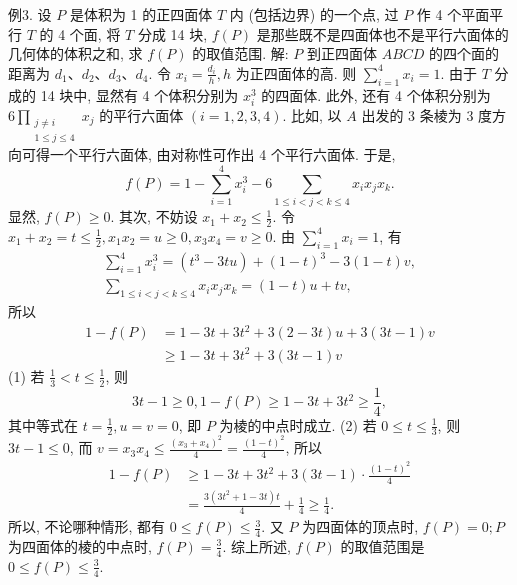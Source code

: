 例3. 设 $P$ 是体积为 1 的正四面体 $T$ 内 (包括边界) 的一个点, 过 $P$ 作 4 个平面平行 $T$ 的 4 个面, 将 $T$ 分成 14 块, $f(P)$ 是那些既不是四面体也不是平行六面体的几何体的体积之和, 求 $f(P)$ 的取值范围.
解: $P$ 到正四面体 $A B C D$ 的四个面的距离为 $d_1 、 d_2 、 d_3 、 d_4$.
令 $x_i=\frac{d_i}{h}, h$ 为正四面体的高.
则 $\sum_{i=1}^4 x_i=1$.
由于 $T$ 分成的 14 块中, 显然有 4 个体积分别为 $x_i^3$ 的四面体.
此外, 还有 4 个体积分别为 $6 \prod_{\substack{j \neq i \\ 1 \leqslant j \leqslant 4}} x_j$ 的平行六面体 $(i=1,2,3,4)$. 比如, 以 $A$ 出发的 3 条棱为 3 度方向可得一个平行六面体, 由对称性可作出 4 个平行六面体.
于是,
$$
f(P)=1-\sum_{i=1}^4 x_i^3-6 \sum_{1 \leqslant i<j<k \leqslant 4} x_i x_j x_k .
$$
显然, $f(P) \geqslant 0$.
其次, 不妨设 $x_1+x_2 \leqslant \frac{1}{2}$. 令 $x_1+x_2=t \leqslant \frac{1}{2}, x_1 x_2=u \geqslant 0, x_3 x_4= v \geqslant 0$. 由 $\sum_{i=1}^4 x_i=1$, 有
$$
\begin{gathered}
\sum_{i=1}^4 x_i^3=\left(t^3-3 t u\right)+(1-t)^3-3(1-t) v, \\
\sum_{1 \leqslant i<j<k \leqslant 4} x_i x_j x_k=(1-t) u+t v,
\end{gathered}
$$
所以
$$
\begin{aligned}
1-f(P) & =1-3 t+3 t^2+3(2-3 t) u+3(3 t-1) v \\
& \geqslant 1-3 t+3 t^2+3(3 t-1) v
\end{aligned}
$$
(1) 若 $\frac{1}{3}<t \leqslant \frac{1}{2}$, 则
$$
3 t-1 \geqslant 0,1-f(P) \geqslant 1-3 t+3 t^2 \geqslant \frac{1}{4},
$$
其中等式在 $t=\frac{1}{2}, u=v=0$, 即 $P$ 为棱的中点时成立.
(2) 若 $0 \leqslant t \leqslant \frac{1}{3}$, 则 $3 t-1 \leqslant 0$, 而 $v=x_3 x_4 \leqslant \frac{\left(x_3+x_4\right)^2}{4}=\frac{(1-t)^2}{4}$, 所以
$$
\begin{aligned}
1-f(P) & \geqslant 1-3 t+3 t^2+3(3 t-1) \cdot \frac{(1-t)^2}{4} \\
& =\frac{3\left(3 t^2+1-3 t\right) t}{4}+\frac{1}{4} \geqslant \frac{1}{4} .
\end{aligned}
$$
所以, 不论哪种情形, 都有 $0 \leqslant f(P) \leqslant \frac{3}{4}$.
又 $P$ 为四面体的顶点时, $f(P)=0 ; P$ 为四面体的棱的中点时, $f(P)= \frac{3}{4}$.
综上所述, $f(P)$ 的取值范围是 $0 \leqslant f(P) \leqslant \frac{3}{4}$.



